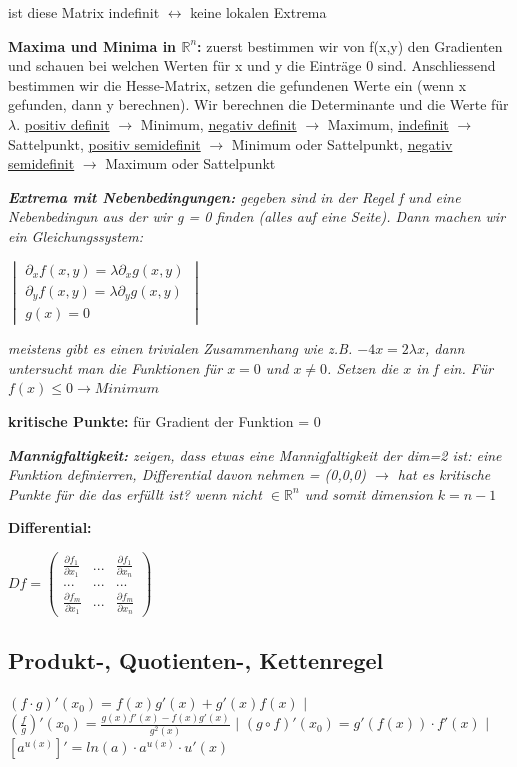 \documentclass[a3paper, ngerman, 8pt]{article}
\begin{document}
\begin{multicols*}{3}
ist diese Matrix indefinit $\leftrightarrow$ keine lokalen Extrema

\textbf{Maxima und Minima in $\mathbb{R}^n$:} zuerst bestimmen wir von f(x,y) den Gradienten und schauen bei welchen Werten für x und y die Einträge 0 sind. Anschliessend bestimmen wir die Hesse-Matrix, setzen die gefundenen Werte ein (wenn x gefunden, dann y berechnen). Wir berechnen die Determinante und die Werte für $\lambda$. \underline{positiv definit} $\to$ Minimum, \underline{negativ definit} $\to$ Maximum, \underline{indefinit} $\to$ Sattelpunkt, \underline{positiv semidefinit} $\to$ Minimum oder  Sattelpunkt, \underline{negativ semidefinit} $\to$ Maximum oder  Sattelpunkt

\textit{\textbf{Extrema mit Nebenbedingungen:} gegeben sind in der Regel f und eine Nebenbedingun aus der wir g = 0 finden (alles auf eine Seite). Dann machen wir ein Gleichungssystem:}

$\begin{vmatrix}
\partial_xf(x,y) = \lambda \partial_x g(x,y) \\
\partial_yf(x,y) = \lambda \partial_y g(x,y)\\
g(x)=0
\end{vmatrix}$

\textit{meistens gibt es einen trivialen Zusammenhang wie z.B. $-4x=2\lambda x$, dann untersucht man die Funktionen für $x=0$ und $x\neq 0$. Setzen die $x$ in f ein. Für $f(x)\leq 0 \to Minimum$}

\textbf{kritische Punkte:} für Gradient der Funktion = $0$

\textit{\textbf{Mannigfaltigkeit:} zeigen, dass etwas eine Mannigfaltigkeit der dim=2 ist: eine Funktion definierren, Differential davon nehmen = (0,0,0) $\to$ hat es kritische Punkte für die das erfüllt ist? wenn nicht $\in \mathbb{R}^n$ und somit dimension $k=n-1$}

\textbf{Differential:}

$Df=\begin{pmatrix}
\frac{\partial f_1}{\partial x_1} & ... & \frac{\partial f_1}{\partial x_n}\\
... & ...& ...\\
\frac{\partial f_m}{\partial x_1} & ... & \frac{\partial f_m}{\partial x_n}
\end{pmatrix}$


\subsection*{Produkt-, Quotienten-, Kettenregel} $(f\cdot g)'(x_0) = f(x)g'(x)+g'(x)f(x)$ $\big \vert$  $(\frac{f}{g})'(x_0) = \frac{g(x)f'(x)-f(x)g'(x)}{g^2(x)}$ $\big \vert$ $(g\circ f)'(x_0)=g'(f(x))\cdot f'(x)$ $\big \vert$ $[a^{u(x)}]'= ln(a)\cdot a^{u(x)}\cdot u'(x)$


\end{multicols*}
\end{document}
